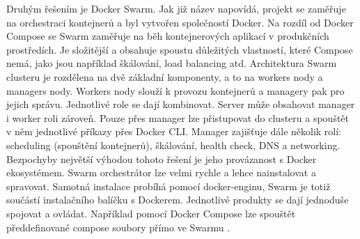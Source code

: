 Druhým řešením je Docker Swarm. Jak již název napovídá, projekt se zaměřuje na orchestraci kontejnerů a byl vytvořen společností Docker. Na rozdíl od Docker Compose se Swarm zaměřuje na běh kontejnerových aplikací v produkčních prostředích. Je složitější a obsahuje spoustu důležitých vlastností, které Compose nemá, jako jsou například škálování, load balancing atd. Architektura Swarm clusteru je rozdělena na dvě základní komponenty, a to na workers nody a managers nody. Workers nody slouží k provozu kontejnerů a managery pak pro jejich správu. Jednotlivé role se dají kombinovat. Server může obsahovat manager i worker roli zároveň. Pouze přes manager lze přistupovat do clusteru a spouštět v něm jednotlivé příkazy přes Docker CLI. Manager zajišťuje dále několik rolí: scheduling (spouštění kontejnerů), škálování, health check, DNS a networking. Bezpochyby největší výhodou tohoto řešení je jeho provázanost s Docker ekosystémem. Swarm orchestrátor lze velmi rychle a lehce nainstalovat a spravovat. Samotná instalace probíhá pomocí docker-enginu, Swarm je totiž součástí instalačního balíčku s Dockerem. Jednotlivé produkty se dají jednoduše spojovat a ovládat. Například pomocí Docker Compose lze spouštět předdefinované compose soubory přímo ve Swarmu \cite{swarm_compose}.

